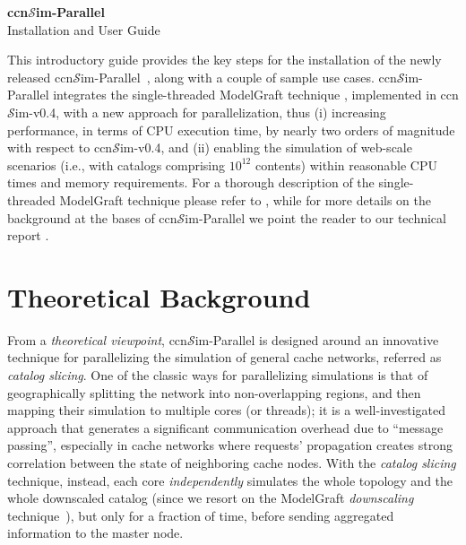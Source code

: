 \documentclass[10pt]{article}
\newcommand{\ccnsim}{ccn\ensuremath{\mathcal{S}}im} %
\begin{document}
{\centering 
	{\Large {\bf \ccnsim-Parallel}}\\
	{\large Installation and User Guide}\\[10pt]
}

This introductory guide provides the key steps for the installation of the newly released \ccnsim-Parallel~\cite{ccnSim}, along with a couple of sample use cases.
\ccnsim-Parallel integrates the single-threaded ModelGraft technique \cite{tortelli-comnet:17}, implemented in \ccnsim-v0.4, with a new approach for parallelization, thus (i) increasing performance, in terms of CPU execution time, by nearly two orders of magnitude with respect to \ccnsim-v0.4, and (ii) enabling the simulation of web-scale scenarios (i.e., with catalogs comprising $10^{12}$ contents) within reasonable CPU times and memory requirements.   
For a thorough description of the single-threaded ModelGraft technique please refer to \cite{tortelli-comnet:17}, while for more details on the background at the bases of \ccnsim-Parallel we point the reader to our technical report \cite{pMG_techRep}.

\section*{Theoretical Background}
From a \emph{theoretical viewpoint}, \ccnsim-Parallel is designed around an innovative technique for parallelizing the simulation of general cache networks, referred as \emph{catalog slicing}. 
One of the classic ways for parallelizing simulations is that of geographically splitting the network into non-overlapping regions, and then mapping their simulation to multiple cores (or threads); it is a well-investigated approach that generates a significant communication overhead due to ``message passing'', especially in cache networks where requests' propagation creates strong correlation between the state of neighboring cache nodes.
With the \emph{catalog slicing} technique, instead, each core \emph{independently} simulates the whole topology and the whole downscaled catalog (since we resort on the ModelGraft \emph{downscaling} technique~\cite{tortelli-comnet:17}), but only for a fraction of time, before sending aggregated information to the master node.
\end{document}
